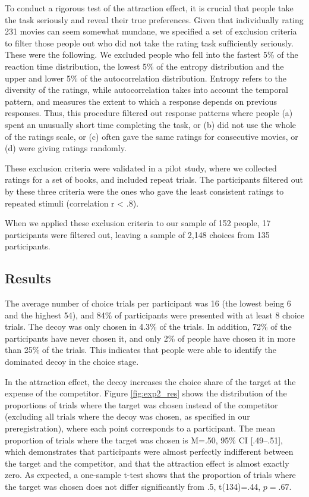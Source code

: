 \documentclass[12pt, a4paper]{article}
\begin{document}
To conduct a rigorous test of the attraction effect, it is crucial that people take the task seriously and reveal their true preferences. Given that individually rating 231 movies can seem somewhat mundane, we specified a set of exclusion criteria to filter those people out who did not take the rating task sufficiently seriously. These were the following. We excluded people who fell into the fastest 5\% of the reaction time distribution, the lowest 5\% of the entropy distribution and the upper and lower 5\% of the autocorrelation distribution. Entropy refers to the diversity of the ratings, while autocorrelation takes into account the temporal pattern, and measures the extent to which a response depends on previous responses. Thus, this procedure filtered out response patterns where people (a) spent an unusually short time completing the task, or (b) did not use the whole of the ratings scale, or (c) often gave the same ratings for consecutive movies, or (d) were giving ratings randomly.

These exclusion criteria were validated in a pilot study, where we collected ratings for a set of books, and included repeat trials. The participants filtered out by these three criteria were the ones who gave the least consistent ratings to repeated stimuli (correlation r < .8).

When we applied these exclusion criteria to our sample of 152 people, 17 participants were filtered out, leaving a sample of 2,148 choices from 135 participants.


\subsection*{Results}

The average number of choice trials per participant was 16 (the lowest being 6 and the highest 54), and 84\% of participants were presented with at least 8 choice trials. The decoy was only chosen in 4.3\% of the trials. In addition, 72\% of the participants have never chosen it, and only 2\% of people have chosen it in more than 25\% of the trials. This indicates that people were able to identify the dominated decoy in the choice stage.

In the attraction effect, the decoy increases the choice share of the target at the expense of the competitor. Figure \ref{fig:exp2_res} shows the distribution of the proportions of trials where the target was chosen instead of the competitor (excluding all trials where the decoy was chosen, as specified in our preregistration), where each point corresponds to a participant. The mean proportion of trials where the target was chosen is M=.50, 95\% CI [.49--.51], which demonstrates that participants were almost perfectly indifferent between the target and the competitor, and that the attraction effect is almost exactly zero. As expected, a one-sample t-test shows that the proportion of trials where the target was chosen does not differ significantly from .5, t(134)=.44, $p=.67$.  
\end{document}
